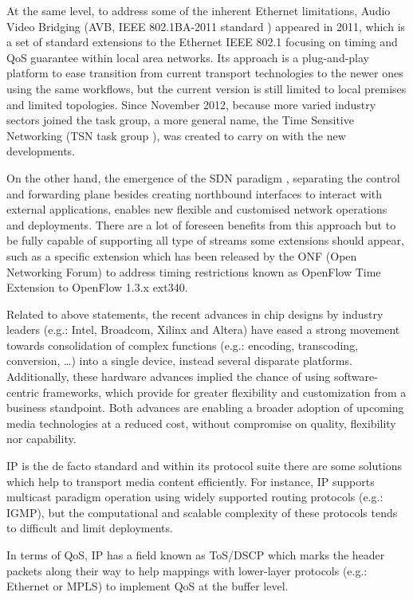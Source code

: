 At the same level, to address some of the inherent Ethernet limitations, Audio Video Bridging (AVB, IEEE 802.1BA-2011 standard \cite{avb}) appeared in 2011, which is a set of standard extensions to the Ethernet IEEE 802.1 \cite{8021} focusing on timing and QoS guarantee within local area networks. Its approach is a plug-and-play platform to ease transition from current transport technologies to the newer ones using the same workflows, but the current version is still limited to local premises and limited topologies. Since November 2012, because more varied industry sectors joined the task group, a more general name, the Time Sensitive Networking (TSN task group \cite{tsn}), was created to carry on with the new developments.

On the other hand, the emergence of the SDN paradigm \cite{sdn}, separating the control and forwarding plane besides creating northbound interfaces to interact with external applications, enables new flexible and customised network operations and deployments. There are a lot of foreseen benefits from this approach but to be fully capable of supporting all type of streams some extensions should appear, such as a specific extension which has been released by the ONF (Open Networking Forum) to address timing restrictions known as OpenFlow \cite{sdn} Time Extension to OpenFlow 1.3.x ext340.

Related to above statements, the recent advances in chip designs by industry leaders (e.g.: Intel, Broadcom, Xilinx and Altera) have eased a strong movement towards consolidation of complex functions (e.g.: encoding, transcoding, conversion, \ldots ) into a single device, instead several disparate platforms. Additionally, these hardware advances implied the chance of using software-centric frameworks, which provide for greater flexibility and customization from a business standpoint. Both advances are enabling a broader adoption of upcoming media technologies at a reduced cost, without compromise on quality, flexibility nor capability. 

IP is the de facto standard and within its protocol suite there are some solutions which help to transport media content efficiently. For instance, IP supports multicast \cite{mc} paradigm operation using widely supported routing protocols (e.g.: IGMP), but the computational and scalable complexity of these protocols tends to difficult and limit deployments.

In terms of QoS, IP has a field known as ToS/DSCP \cite{tosdscp} which marks the header packets along their way to help mappings with lower-layer protocols (e.g.: Ethernet or MPLS) to implement QoS at the buffer level.

